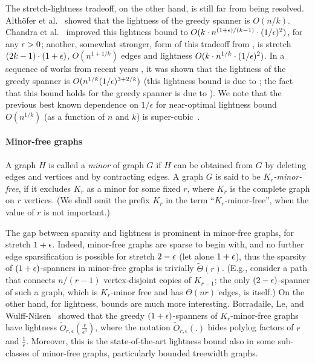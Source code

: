 The stretch-lightness tradeoff, on the other hand, is still far from being resolved.  %
Alth\"{o}fer et al.~\cite{ADDJS93}   showed that the lightness of the greedy spanner is $O(n/k)$. Chandra et al.~\cite{CDNS92} improved this lightness bound to $O(k \cdot n^{(1+\epsilon)/{(k-1)}} \cdot (1/\epsilon)^2)$, for any $\epsilon > 0$;
another, somewhat stronger, form of this tradeoff from \cite{CDNS92}, is stretch $(2k-1)\cdot(1+\epsilon)$,
$O(n^{1+1/k})$ edges and lightness $O(k \cdot n^{1/{k}} \cdot (1/\epsilon)^{2})$.
In a sequence of works from recent years \cite{ENS14,CW16,FS16},
it was shown that the lightness of the greedy spanner is
$O(n^{1/k} (1/\epsilon)^{3+2/k})$ (this lightness bound is due to \cite{CW16}; the fact that this bound holds   for the greedy spanner is due to \cite{FS16}).
We note that the previous best known dependence on $1/\epsilon$ for near-optimal lightness bound $O(n^{1/{k}})$ (as a function of $n$ and $k$)
is super-cubic~\cite{CW16,FS16}. 

\paragraph{Minor-free graphs}
A graph $H$ is called a \emph{minor} of graph $G$ if $H$ can be obtained from $G$ by deleting edges and vertices and by contracting edges. A graph $G$ is said to be {\em $K_r$-minor-free},
if it excludes  $K_r$ as a minor for some fixed $r$, where $K_r$ is the complete graph on $r$ vertices. (We shall omit the prefix $K_r$ in the term ``$K_r$-minor-free'',   when the value of $r$ is not important.)

The gap between sparsity and lightness is prominent in minor-free graphs, for stretch $1+\epsilon$.
Indeed, minor-free graphs are sparse to begin with, and no further edge sparsification is possible for stretch $2-\epsilon$ (let alone $1+\epsilon$),
thus the sparsity of $(1+\epsilon)$-spanners in minor-free graphs is trivially $\tilde \Theta(r)$. 
(E.g., consider a path that connects $n/(r-1)$ vertex-disjoint copies of $K_{r-1}$;
the only $(2-\epsilon)$-spanner of such a graph, which is $K_r$-minor free and has $\Theta(n r)$ edges, is itself.)
On the other hand, for lightness, bounds are much more interesting.
Borradaile, Le, and Wulff-Nilsen~\cite{BLW17} showed that the greedy $(1+\epsilon)$-spanners of $K_r$-minor-free graphs have lightness $\tilde{O}_{r,\epsilon}(\frac{r}{\epsilon^3})$, where the notation $\tilde{O}_{r,\epsilon}(.)$ hides polylog factors of $r$ and $\frac{1}{\epsilon}$. Moreover, this is the state-of-the-art lightness bound also in some sub-classes of minor-free graphs, particularly bounded treewidth graphs.

